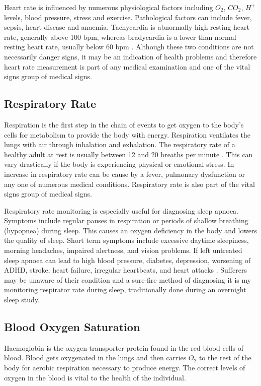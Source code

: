 \medskip
Heart rate is influenced by numerous physiological factors including $O_2$, $CO_2$, $H^+$ levels, blood pressure, stress and exercise. Pathological factors can include fever, sepsis, heart disease and anaemia. Tachycardia is abnormally high resting heart rate, generally above 100 bpm, whereas bradycardia is a lower than normal resting heart rate, usually below 60 bpm \citep{normalRestingHR}. Although these two conditions are not necessarily danger signs, it may be an indication of health problems and therefore heart rate measurement is part of any medical examination and one of the vital signs group of medical signs.

\subsection{Respiratory Rate}
Respiration is the first step in the chain of events to get oxygen to the body's cells for metabolism to provide the body with energy. Respiration ventilates the lungs with air through inhalation and exhalation. The respiratory rate of a healthy adult at rest is usually between 12 and 20 breaths per minute \citep{medscapeBreathingRate}. This can vary drastically if the body is experiencing physical or emotional stress. In increase in respiratory rate can be cause by a fever, pulmonary dysfunction or any one of numerous medical conditions. Respiratory rate is also part of the vital signs group of medical signs.

\medskip
Respiratory rate monitoring is especially useful for diagnosing sleep apnoea. Symptoms include regular pauses in respiration or periods of shallow breathing (hypopnea) during sleep. This causes an oxygen deficiency in the body and lowers the quality of sleep. Short term symptoms include excessive daytime sleepiness, morning headaches, impaired alertness, and vision problems. If left untreated sleep apnoea can lead to high blood pressure, diabetes, depression, worsening of ADHD, stroke, heart failure, irregular heartbeats, and heart attacks \citep{webMDSleepApnoea}. Sufferers may be unaware of their condition and a sure-fire method of diagnosing it is my monitoring respirator rate during sleep, traditionally done during an overnight sleep study.

\subsection{Blood Oxygen Saturation}

Haemoglobin is the oxygen transporter protein found in the red blood cells of blood. Blood gets oxygenated in the lungs and then carries $O_2$ to the rest of the body for aerobic respiration necessary to produce energy. The correct levels of oxygen in the blood is vital to the health of the individual.

